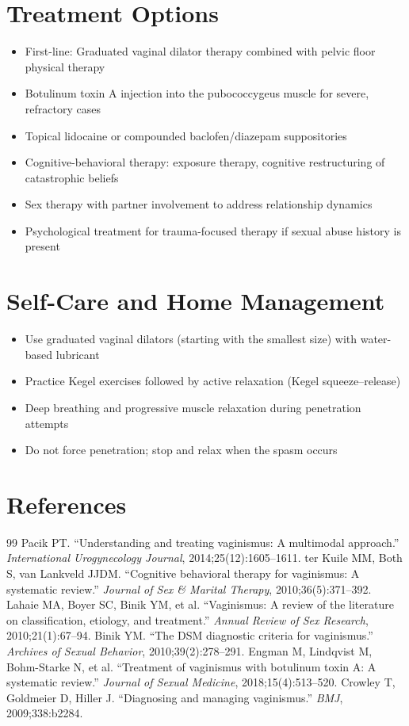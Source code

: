 \section*{Treatment Options}
\begin{itemize}
  \item First-line: Graduated vaginal dilator therapy combined with pelvic floor physical therapy
  \item Botulinum toxin A injection into the pubococcygeus muscle for severe, refractory cases
  \item Topical lidocaine or compounded baclofen/diazepam suppositories
  \item Cognitive-behavioral therapy: exposure therapy, cognitive restructuring of catastrophic beliefs
  \item Sex therapy with partner involvement to address relationship dynamics
  \item Psychological treatment for trauma-focused therapy if sexual abuse history is present
\end{itemize}

\section*{Self-Care and Home Management}
\begin{itemize}
  \item Use graduated vaginal dilators (starting with the smallest size) with water-based lubricant
  \item Practice Kegel exercises followed by active relaxation (Kegel squeeze--release)
  \item Deep breathing and progressive muscle relaxation during penetration attempts
  \item Do not force penetration; stop and relax when the spasm occurs
\end{itemize}

\section*{References}
\begin{thebibliography}{99}
 Pacik PT. ``Understanding and treating vaginismus: A multimodal approach.'' \textit{International Urogynecology Journal}, 2014;25(12):1605--1611.
 ter Kuile MM, Both S, van Lankveld JJDM. ``Cognitive behavioral therapy for vaginismus: A systematic review.'' \textit{Journal of Sex \& Marital Therapy}, 2010;36(5):371--392.
 Lahaie MA, Boyer SC, Binik YM, et al. ``Vaginismus: A review of the literature on classification, etiology, and treatment.'' \textit{Annual Review of Sex Research}, 2010;21(1):67--94.
 Binik YM. ``The DSM diagnostic criteria for vaginismus.'' \textit{Archives of Sexual Behavior}, 2010;39(2):278--291.
 Engman M, Lindqvist M, Bohm-Starke N, et al. ``Treatment of vaginismus with botulinum toxin A: A systematic review.'' \textit{Journal of Sexual Medicine}, 2018;15(4):513--520.
 Crowley T, Goldmeier D, Hiller J. ``Diagnosing and managing vaginismus.'' \textit{BMJ}, 2009;338:b2284.
\end{thebibliography}
